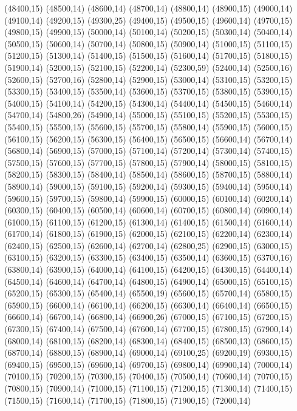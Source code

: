 (48400,15)
(48500,14)
(48600,14)
(48700,14)
(48800,14)
(48900,15)
(49000,14)
(49100,14)
(49200,15)
(49300,25)
(49400,15)
(49500,15)
(49600,14)
(49700,15)
(49800,15)
(49900,15)
(50000,14)
(50100,14)
(50200,15)
(50300,14)
(50400,14)
(50500,15)
(50600,14)
(50700,14)
(50800,15)
(50900,14)
(51000,15)
(51100,15)
(51200,15)
(51300,14)
(51400,15)
(51500,15)
(51600,14)
(51700,15)
(51800,15)
(51900,14)
(52000,15)
(52100,15)
(52200,14)
(52300,59)
(52400,14)
(52500,16)
(52600,15)
(52700,16)
(52800,14)
(52900,15)
(53000,14)
(53100,15)
(53200,15)
(53300,15)
(53400,15)
(53500,14)
(53600,15)
(53700,15)
(53800,15)
(53900,15)
(54000,15)
(54100,14)
(54200,15)
(54300,14)
(54400,14)
(54500,15)
(54600,14)
(54700,14)
(54800,26)
(54900,14)
(55000,15)
(55100,15)
(55200,15)
(55300,15)
(55400,15)
(55500,15)
(55600,15)
(55700,15)
(55800,14)
(55900,15)
(56000,15)
(56100,15)
(56200,15)
(56300,15)
(56400,15)
(56500,15)
(56600,14)
(56700,14)
(56800,14)
(56900,15)
(57000,15)
(57100,14)
(57200,14)
(57300,14)
(57400,15)
(57500,15)
(57600,15)
(57700,15)
(57800,15)
(57900,14)
(58000,15)
(58100,15)
(58200,15)
(58300,15)
(58400,14)
(58500,14)
(58600,15)
(58700,15)
(58800,14)
(58900,14)
(59000,15)
(59100,15)
(59200,14)
(59300,15)
(59400,14)
(59500,14)
(59600,15)
(59700,15)
(59800,14)
(59900,15)
(60000,15)
(60100,14)
(60200,14)
(60300,15)
(60400,15)
(60500,14)
(60600,14)
(60700,15)
(60800,14)
(60900,14)
(61000,15)
(61100,15)
(61200,15)
(61300,14)
(61400,15)
(61500,14)
(61600,14)
(61700,14)
(61800,15)
(61900,15)
(62000,15)
(62100,15)
(62200,14)
(62300,14)
(62400,15)
(62500,15)
(62600,14)
(62700,14)
(62800,25)
(62900,15)
(63000,15)
(63100,15)
(63200,15)
(63300,15)
(63400,15)
(63500,14)
(63600,15)
(63700,16)
(63800,14)
(63900,15)
(64000,14)
(64100,15)
(64200,15)
(64300,15)
(64400,14)
(64500,14)
(64600,14)
(64700,14)
(64800,15)
(64900,14)
(65000,15)
(65100,15)
(65200,15)
(65300,15)
(65400,14)
(65500,19)
(65600,15)
(65700,14)
(65800,15)
(65900,15)
(66000,14)
(66100,14)
(66200,15)
(66300,14)
(66400,14)
(66500,15)
(66600,14)
(66700,14)
(66800,14)
(66900,26)
(67000,15)
(67100,15)
(67200,15)
(67300,15)
(67400,14)
(67500,14)
(67600,14)
(67700,15)
(67800,15)
(67900,14)
(68000,14)
(68100,15)
(68200,14)
(68300,14)
(68400,15)
(68500,13)
(68600,15)
(68700,14)
(68800,15)
(68900,14)
(69000,14)
(69100,25)
(69200,19)
(69300,15)
(69400,15)
(69500,15)
(69600,14)
(69700,15)
(69800,14)
(69900,14)
(70000,14)
(70100,15)
(70200,15)
(70300,15)
(70400,15)
(70500,14)
(70600,14)
(70700,15)
(70800,15)
(70900,14)
(71000,15)
(71100,15)
(71200,15)
(71300,14)
(71400,15)
(71500,15)
(71600,14)
(71700,15)
(71800,15)
(71900,15)
(72000,14)
